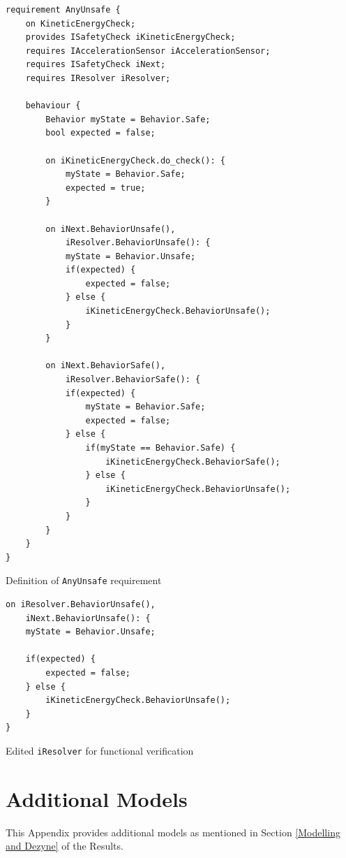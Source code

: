 \documentclass[12pt]{scrreprt}
\begin{document}
\begin{appendices}
\begin{listing}
\begin{verbatim}
requirement AnyUnsafe {
	on KineticEnergyCheck;
	provides ISafetyCheck iKineticEnergyCheck;
	requires IAccelerationSensor iAccelerationSensor;
	requires ISafetyCheck iNext;
	requires IResolver iResolver;

    behaviour {
        Behavior myState = Behavior.Safe;
        bool expected = false;

        on iKineticEnergyCheck.do_check(): {
            myState = Behavior.Safe;
            expected = true;
        }

        on iNext.BehaviorUnsafe(),
            iResolver.BehaviorUnsafe(): {
            myState = Behavior.Unsafe;
            if(expected) {
                expected = false;
            } else {
                iKineticEnergyCheck.BehaviorUnsafe();
            }
        }

        on iNext.BehaviorSafe(),
            iResolver.BehaviorSafe(): {
            if(expected) {
                myState = Behavior.Safe;
                expected = false;
            } else {
                if(myState == Behavior.Safe) {
                    iKineticEnergyCheck.BehaviorSafe();
                } else {
                    iKineticEnergyCheck.BehaviorUnsafe();
                }
            }
        }
    }
}
\end{verbatim} 
\label{mfunctional_requirement}
\caption{Definition of \texttt{AnyUnsafe} requirement}
\end{listing}

\begin{listing}
\begin{verbatim}
on iResolver.BehaviorUnsafe(),
	iNext.BehaviorUnsafe(): {
	myState = Behavior.Unsafe;

	if(expected) {
	    expected = false;
	} else {
    	iKineticEnergyCheck.BehaviorUnsafe();
	}
}

\end{verbatim}

\label{modified_ke}
\caption{Edited \texttt{iResolver} for  functional verification}
\end{listing}


\chapter{Additional Models}
\label{Additional Models}
This Appendix provides additional models as mentioned in Section \ref{Modelling and Dezyne} of the Results.


\end{appendices}
\end{document}
